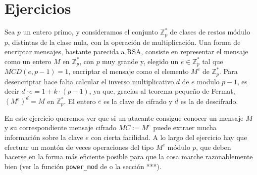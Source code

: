 



\section{Ejercicios}
 \begin{ejer}
 
 Sea $p$ un entero primo, y consideramos el conjunto $\mathbb{Z}_{p}^{*}$ de
clases de restos m\'odulo $p$, distintas de la clase nula,  con la operaci\'on
de multiplicaci\'on.  Una forma de encriptar mensajes, bastante parecida a RSA,
consiste en representar el mensaje como un entero $M$  en $\mathbb{Z}_{p}^{*}$,
con $p$ muy grande y, elegido un $e \in \mathbb{Z}_{p}^{*}$  tal que 
$MCD(e,p-1)=1$, 
encriptar el mensaje como el elemento $M^e$ de
$\mathbb{Z}_{p}^{*}$.  Para desencriptar hace falta calcular el inverso
multiplicativo $d$ de $e$ modulo $p-1$, es decir $d\cdot e=1+k\cdot(p-1)$,  ya
que,  gracias al teorema pequeño de Fermat,  $(M^e)^d=M$ en
$\mathbb{Z}_{p}^{*}$.  El entero $e$ es la clave de cifrado y $d$ es la de
descifrado.

En este ejercicio queremos ver que si un atacante consigue conocer un mensaje
$M$ y su correspondiente mensaje cifrado $MC:=M^e$   puede extraer mucha
informaci\'on sobre la clave $e$ con cierta facilidad. A lo largo del ejercicio
hay que efectuar un mont\'on de veces operaciones del tipo $M^e$ m\'odulo $p$,
que deben hacerse en la forma m\'as eficiente posible para que la cosa marche
razonablemente bien (ver la funci\'on \lstinline|power_mod| de {\sage} o la
secci\'on ***). 


\end{ejer}
